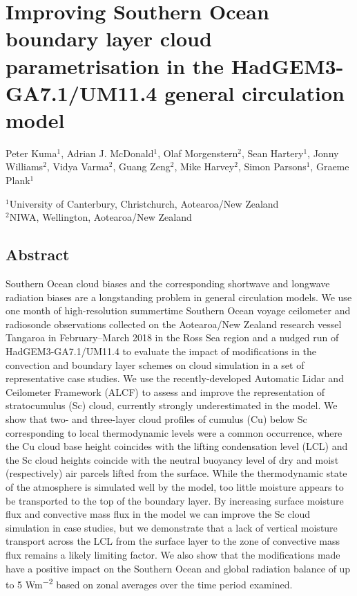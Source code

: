 \chapter{Improving Southern Ocean boundary layer cloud para\-metrisation in the HadGEM3-GA7.1/UM11.4 general circulation model}

\vspace{-0.1cm}\begin{spacing}{1.2}\sffamily\raggedright
Peter Kuma$^1$, Adrian J. McDonald$^1$, Olaf Morgenstern$^2$, Sean Hartery$^1$, Jonny Williams$^2$, Vidya Varma$^2$, Guang Zeng$^2$, Mike Harvey$^2$, Simon Parsons$^1$, Graeme Plank$^1$
\end{spacing}

\vspace{0.4cm}\begin{spacing}{1.2}\footnotesize\sffamily\noindent\raggedright
$^1$University of Canterbury, Christchurch, Aotearoa/New Zealand\\
$^2$NIWA, Wellington, Aotearoa/New Zealand
\end{spacing}
\vspace{-0.1cm}

\section*{Abstract}

Southern Ocean cloud biases and the corresponding shortwave and longwave radiation
biases are a longstanding problem in general circulation models. We use one month of high-resolution summertime
Southern Ocean voyage ceilometer and radiosonde observations collected on the Aotearoa/New Zealand research vessel Tangaroa in February--March
2018 in the Ross Sea region
and a nudged run of HadGEM3-GA7.1/UM11.4 to
evaluate the impact of modifications in the convection and boundary layer
schemes on cloud simulation in a set of representative case studies. We use the recently-developed Automatic Lidar and Ceilometer Framework (ALCF) to assess and improve the representation of stratocumulus (Sc) cloud,
currently strongly underestimated in the model. We show that two- and three-layer cloud
profiles of cumulus (Cu) below Sc corresponding to local thermodynamic levels were a common occurrence, where
the Cu cloud base height coincides with the lifting condensation level (LCL)
and the Sc cloud heights coincide with the neutral buoyancy level of dry and moist (respectively) air
parcels lifted from the surface.
While the thermodynamic state of the atmosphere is simulated
well by the model, too little moisture appears to be transported to the top of the boundary layer. By increasing surface moisture flux and convective mass flux in the model we can improve the Sc cloud simulation in case studies, but we demonstrate that a lack of vertical moisture transport
across the LCL from the surface layer to the zone of convective mass flux remains a likely limiting factor.
We also show that the modifications made have a positive impact on the Southern Ocean and
global radiation balance of up to 5 \unit{Wm^{-2}} based on zonal averages over the time period examined.

